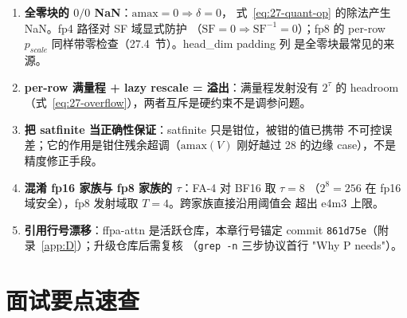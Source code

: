 \begin{enumerate}[itemsep=2pt,topsep=2pt]
  \item \textbf{全零块的 $0/0$ NaN}：$\mathrm{amax} = 0 \Rightarrow \delta = 0$，
        式~\ref{eq:27-quant-op} 的除法产生 NaN。fp4 路径对 SF 域显式防护
        （$\mathrm{SF} = 0 \Rightarrow \mathrm{SF}^{-1} = 0$）；fp8 的
        per-row $p_{scale}$ 同样带零检查（27.4~节）。head\_dim padding 列
        是全零块最常见的来源。
  \item \textbf{per-row 满量程 + lazy rescale = 溢出}：满量程发射没有 $2^{\tau}$
        的 headroom（式~\ref{eq:27-overflow}），两者互斥是硬约束不是调参问题。
  \item \textbf{把 satfinite 当正确性保证}：satfinite 只是钳位，被钳的值已携带
        不可控误差；它的作用是钳住残余超调（$\mathrm{amax}(V)$ 刚好越过 28
        的边缘 case），不是精度修正手段。
  \item \textbf{混淆 fp16 家族与 fp8 家族的 $\tau$}：FA-4 对 BF16 取 $\tau = 8$
        （$2^8 = 256$ 在 fp16 域安全），fp8 发射域取 $T = 4$。跨家族直接沿用阈值会
        超出 e4m3 上限。
  \item \textbf{引用行号漂移}：ffpa-attn 是活跃仓库，本章行号锚定 commit
        \texttt{861d75e}（附录~\ref{app:D}）；升级仓库后需复核
        （\texttt{grep -n} 三步协议首行 "Why P needs"）。
\end{enumerate}

\section{面试要点速查}

